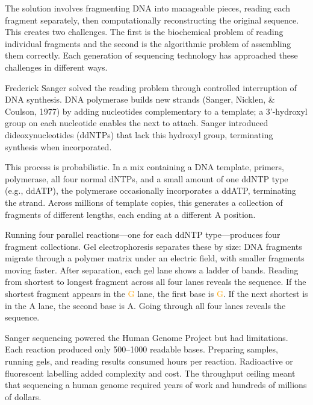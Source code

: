 The solution involves fragmenting DNA into manageable pieces, reading each fragment separately, then computationally reconstructing the original sequence. This creates two challenges. The first is the biochemical problem of reading individual fragments and the second is the algorithmic problem of assembling them correctly. Each generation of sequencing technology has approached these challenges in different ways.

Frederick Sanger solved the reading problem through controlled interruption of DNA synthesis. DNA polymerase builds new strands (Sanger, Nicklen, \& Coulson, 1977) by adding nucleotides complementary to a template; a 3'-hydroxyl group on each nucleotide enables the next to attach. Sanger introduced dideoxynucleotides (ddNTPs) that lack this hydroxyl group, terminating synthesis when incorporated.

This process is probabilistic. In a mix containing a DNA template, primers, polymerase, all four normal dNTPs, and a small amount of one ddNTP type (e.g., dd\textcolor{green!60!black}{A}TP), the polymerase occasionally incorporates a dd\textcolor{green!60!black}{A}TP, terminating the strand. Across millions of template copies, this generates a collection of fragments of different lengths, each ending at a different \textcolor{green!60!black}{A} position.

Running four parallel reactions—one for each ddNTP type—produces four fragment collections. Gel electrophoresis separates these by size: DNA fragments migrate through a polymer matrix under an electric field, with smaller fragments moving faster. After separation, each gel lane shows a ladder of bands. Reading from shortest to longest fragment across all four lanes reveals the sequence. If the shortest fragment appears in the \textcolor{orange}{G} lane, the first base is \textcolor{orange}{G}. If the next shortest is in the \textcolor{green!60!black}{A} lane, the second base is \textcolor{green!60!black}{A}. Going through all four lanes reveals the sequence.

Sanger sequencing powered the Human Genome Project but had limitations. Each reaction produced only 500–1000 readable bases. Preparing samples, running gels, and reading results consumed hours per reaction. Radioactive or fluorescent labelling added complexity and cost. The throughput ceiling meant that sequencing a human genome required years of work and hundreds of millions of dollars.

